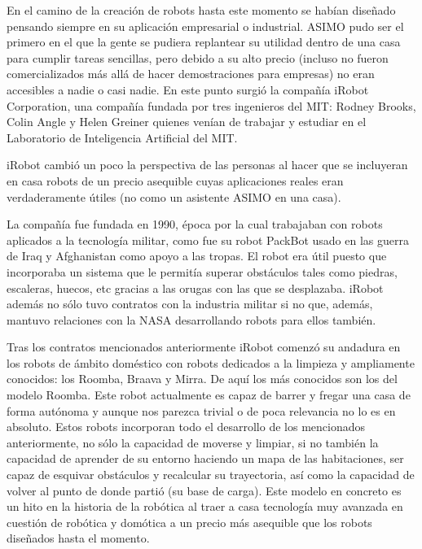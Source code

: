 En el camino de la creación de robots hasta este momento se habían diseñado pensando siempre en su aplicación empresarial o industrial. ASIMO pudo ser el primero en el que la gente se pudiera replantear su utilidad dentro de una casa para cumplir tareas sencillas, pero debido a su alto precio (incluso no fueron comercializados más allá de hacer demostraciones para empresas) no eran accesibles a nadie o casi nadie. En este punto surgió la compañía iRobot Corporation, una compañía fundada por tres ingenieros del MIT: Rodney Brooks, Colin Angle y Helen Greiner quienes venían de trabajar y estudiar en el Laboratorio de Inteligencia Artificial del MIT.

iRobot cambió un poco la perspectiva de las personas al hacer que se incluyeran en casa robots de un precio asequible cuyas aplicaciones reales eran verdaderamente útiles (no como un asistente ASIMO en una casa).

La compañía fue fundada en 1990, época por la cual trabajaban con robots aplicados a la tecnología militar, como fue su robot PackBot usado en las guerra de Iraq y Afghanistan como apoyo a las tropas. El robot era útil puesto que incorporaba un sistema que le permitía superar obstáculos tales como piedras, escaleras, huecos, etc gracias a las orugas con las que se desplazaba. iRobot además no sólo tuvo contratos con la industria militar si no que, además, mantuvo relaciones con la NASA desarrollando robots para ellos también.

Tras los contratos mencionados anteriormente iRobot comenzó su andadura en los robots de ámbito doméstico con robots dedicados a la limpieza y ampliamente conocidos: los Roomba, Braava y Mirra. De aquí los más conocidos son los del modelo Roomba. Este robot actualmente es capaz de barrer y fregar una casa de forma autónoma y aunque nos parezca trivial o de poca relevancia no lo es en absoluto. Estos robots incorporan todo el desarrollo de los mencionados anteriormente, no sólo la capacidad de moverse y limpiar, si no también la capacidad de aprender de su entorno haciendo un mapa de las habitaciones, ser capaz de esquivar obstáculos y recalcular su trayectoria, así como la capacidad de volver al punto de donde partió (su base de carga). Este modelo en concreto es un hito en la historia de la robótica al traer a casa tecnología muy avanzada en cuestión de robótica y domótica a un precio más asequible que los robots diseñados hasta el momento.
